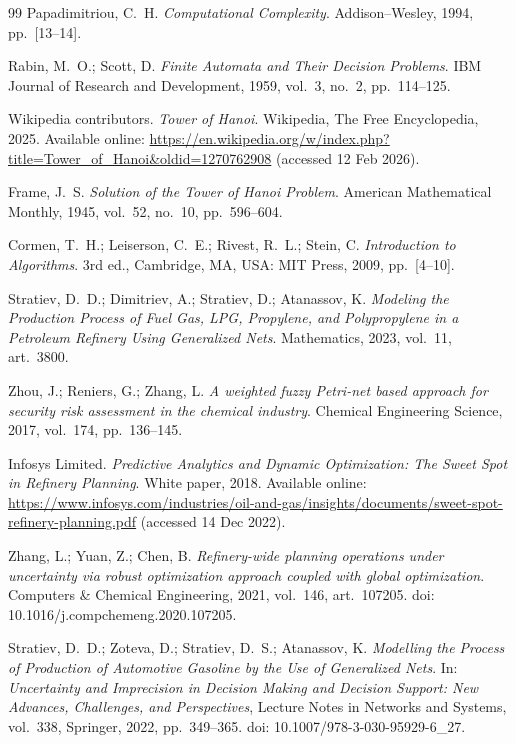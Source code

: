 \begin{thebibliography}{99}
Papadimitriou, C.~H.
\newblock \emph{Computational Complexity}.
\newblock Addison--Wesley, 1994, pp.~[13--14].

Rabin, M.~O.; Scott, D.
\newblock \emph{Finite Automata and Their Decision Problems}.
\newblock IBM Journal of Research and Development, 1959, vol.~3, no.~2, pp.~114--125.

Wikipedia contributors.
\newblock \emph{Tower of Hanoi}.
\newblock Wikipedia, The Free Encyclopedia, 2025.
\newblock Available online: \url{https://en.wikipedia.org/w/index.php?title=Tower_of_Hanoi&oldid=1270762908} (accessed 12 Feb 2026).

Frame, J.~S.
\newblock \emph{Solution of the Tower of Hanoi Problem}.
\newblock American Mathematical Monthly, 1945, vol.~52, no.~10, pp.~596--604.

Cormen, T.~H.; Leiserson, C.~E.; Rivest, R.~L.; Stein, C.
\newblock \emph{Introduction to Algorithms}.
\newblock 3rd ed., Cambridge, MA, USA: MIT Press, 2009, pp.~[4--10].

Stratiev, D.~D.; Dimitriev, A.; Stratiev, D.; Atanassov, K.
\newblock \emph{Modeling the Production Process of Fuel Gas, LPG, Propylene, and Polypropylene in a Petroleum Refinery Using Generalized Nets}.
\newblock Mathematics, 2023, vol.~11, art.~3800.

Zhou, J.; Reniers, G.; Zhang, L.
\newblock \emph{A weighted fuzzy Petri-net based approach for security risk assessment in the chemical industry}.
\newblock Chemical Engineering Science, 2017, vol.~174, pp.~136--145.

Infosys Limited.
\newblock \emph{Predictive Analytics and Dynamic Optimization: The Sweet Spot in Refinery Planning}.
\newblock White paper, 2018.
\newblock Available online: \url{https://www.infosys.com/industries/oil-and-gas/insights/documents/sweet-spot-refinery-planning.pdf} (accessed 14 Dec 2022).

Zhang, L.; Yuan, Z.; Chen, B.
\newblock \emph{Refinery-wide planning operations under uncertainty via robust optimization approach coupled with global optimization}.
\newblock Computers \& Chemical Engineering, 2021, vol.~146, art.~107205.
\newblock doi: 10.1016/j.compchemeng.2020.107205.

Stratiev, D.~D.; Zoteva, D.; Stratiev, D.~S.; Atanassov, K.
\newblock \emph{Modelling the Process of Production of Automotive Gasoline by the Use of Generalized Nets}.
\newblock In: \emph{Uncertainty and Imprecision in Decision Making and Decision Support: New Advances, Challenges, and Perspectives},
Lecture Notes in Networks and Systems, vol.~338, Springer, 2022, pp.~349--365.
\newblock doi: 10.1007/978-3-030-95929-6\_27.


\end{thebibliography}
